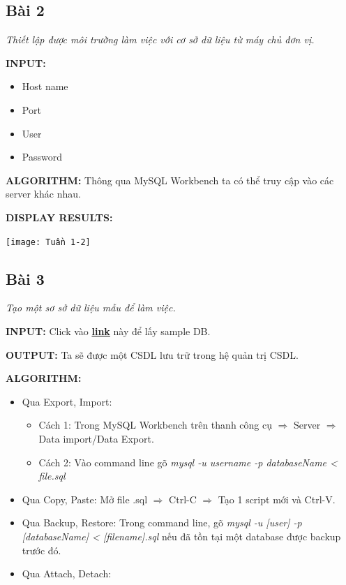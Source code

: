 \documentclass[12pt,a4paper]{report}
\begin{document}
\subsection{Bài 2}
	\begin{center}
		{\it Thiết lập được môi trường làm việc với cơ sở dữ liệu từ máy chủ đơn vị.}
	\end{center}

	{\bf INPUT:}
		\begin{itemize}
			\item Host name
			\item Port
			\item User
			\item Password
		\end{itemize}
	
	{\bf ALGORITHM:}
		Thông qua MySQL Workbench ta có thể truy cập vào các server khác nhau.
	
	{\bf DISPLAY RESULTS:}
		\vskip 0.2cm
		\begin{center}
			\texttt{[image: Tuần 1-2]}
		\end{center}	
\subsection{Bài 3}
	\begin{center}
		{\it Tạo một sơ sở dữ liệu mẫu để làm việc.}
	\end{center}
	
	{\bf INPUT:}
		Click vào \href{https://www.mysqltutorial.org/mysql-sample-database.aspx?fbclid=IwAR2r3gprprxYYPcvhDT4RFaJo9Xgb9RMwhvLpqRLgD35RAV00l8oDvqc9SU}{\bf link} này để lấy sample DB.
	
	{\bf OUTPUT:}
		Ta sẽ được một CSDL lưu trữ trong hệ quản trị CSDL.
	
	{\bf ALGORITHM:}
		\begin{itemize}
			\item Qua Export, Import:
				\begin{itemize}
					\item Cách 1: Trong MySQL Workbench trên thanh công cụ $\Longrightarrow$ Server $\Longrightarrow$ Data import/Data Export.
					\item Cách 2: Vào command line gõ {\it mysql -u username -p databaseName < file.sql}
				\end{itemize}
			\item Qua Copy, Paste: Mở file .sql $\Longrightarrow$ Ctrl-C $\Longrightarrow$ Tạo 1 script mới và Ctrl-V.
			\item Qua Backup, Restore: Trong command line, gõ {\it mysql -u [user] -p [databaseName] < [filename].sql} nếu đã tồn tại một database được backup trước đó.
			\item Qua Attach, Detach:
		\end{itemize}
	
\end{document}

